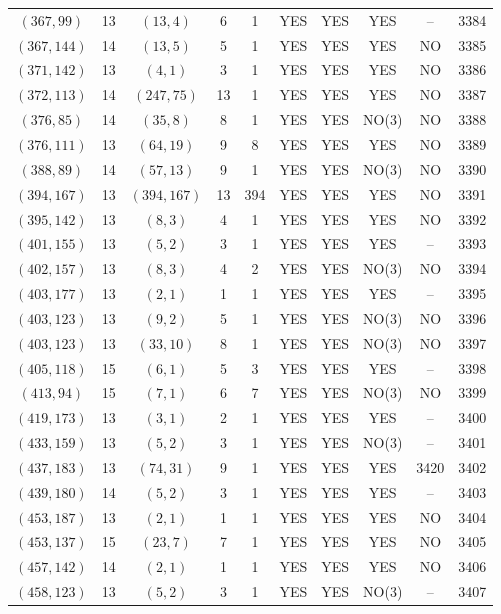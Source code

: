 \begin{longtable}{|c|c|c|c|c|c|c|c|c|c|}
$(367, 99)$ & 13 & $(13, 4)$ & 6 & 1 & YES & YES & YES & -- & 3384\\
$(367, 144)$ & 14 & $(13, 5)$ & 5 & 1 & YES & YES & YES & NO & 3385\\
$(371, 142)$ & 13 & $(4, 1)$ & 3 & 1 & YES & YES & YES & NO & 3386\\
$(372, 113)$ & 14 & $(247, 75)$ & 13 & 1 & YES & YES & YES & NO & 3387\\
$(376, 85)$ & 14 & $(35, 8)$ & 8 & 1 & YES & YES & NO(3) & NO & 3388\\
$(376, 111)$ & 13 & $(64, 19)$ & 9 & 8 & YES & YES & YES & NO & 3389\\
$(388, 89)$ & 14 & $(57, 13)$ & 9 & 1 & YES & YES & NO(3) & NO & 3390\\
$(394, 167)$ & 13 & $(394, 167)$ & 13 & 394 & YES & YES & YES & NO & 3391\\
$(395, 142)$ & 13 & $(8, 3)$ & 4 & 1 & YES & YES & YES & NO & 3392\\
$(401, 155)$ & 13 & $(5, 2)$ & 3 & 1 & YES & YES & YES & -- & 3393\\
$(402, 157)$ & 13 & $(8, 3)$ & 4 & 2 & YES & YES & NO(3) & NO & 3394\\
$(403, 177)$ & 13 & $(2, 1)$ & 1 & 1 & YES & YES & YES & -- & 3395\\
$(403, 123)$ & 13 & $(9, 2)$ & 5 & 1 & YES & YES & NO(3) & NO & 3396\\
$(403, 123)$ & 13 & $(33, 10)$ & 8 & 1 & YES & YES & NO(3) & NO & 3397\\
$(405, 118)$ & 15 & $(6, 1)$ & 5 & 3 & YES & YES & YES & -- & 3398\\
$(413, 94)$ & 15 & $(7, 1)$ & 6 & 7 & YES & YES & NO(3) & NO & 3399\\
$(419, 173)$ & 13 & $(3, 1)$ & 2 & 1 & YES & YES & YES & -- & 3400\\
$(433, 159)$ & 13 & $(5, 2)$ & 3 & 1 & YES & YES & NO(3) & -- & 3401\\
$(437, 183)$ & 13 & $(74, 31)$ & 9 & 1 & YES & YES & YES & 3420 & 3402\\
$(439, 180)$ & 14 & $(5, 2)$ & 3 & 1 & YES & YES & YES & -- & 3403\\
$(453, 187)$ & 13 & $(2, 1)$ & 1 & 1 & YES & YES & YES & NO & 3404\\
$(453, 137)$ & 15 & $(23, 7)$ & 7 & 1 & YES & YES & YES & NO & 3405\\
$(457, 142)$ & 14 & $(2, 1)$ & 1 & 1 & YES & YES & YES & NO & 3406\\
$(458, 123)$ & 13 & $(5, 2)$ & 3 & 1 & YES & YES & NO(3) & -- & 3407\\

\end{longtable}
